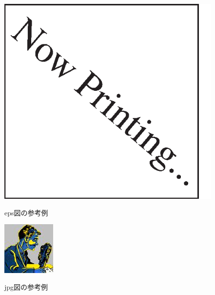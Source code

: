 \documentclass{jarticle}
\begin{document}
\begin{figure}[tbh]
 \begin{center}
  \begin{minipage}{0.3\columnwidth}
   \includegraphics[width=\columnwidth]{nowprinting.eps}
   \caption{eps図の参考例}
  \end{minipage}
  \hspace{0.15\columnwidth}
  \begin{minipage}{0.3\columnwidth}
   \includegraphics[width=\columnwidth]{dj.jpg}
   \caption{jpg図の参考例}
  \end{minipage}
  \label{figure:nowprinting}
 \end{center}
\end{figure}
\end{document}
